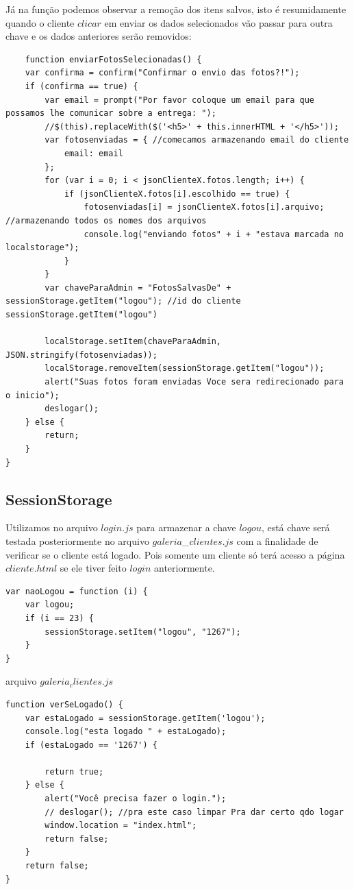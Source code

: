 	Já na função podemos observar a remoção dos itens salvos, isto é resumidamente quando o cliente $clicar$ em enviar os dados selecionados vão passar para outra chave e os dados anteriores serão removidos:
	\begin{lstlisting}	
	function enviarFotosSelecionadas() {
    var confirma = confirm("Confirmar o envio das fotos?!");
    if (confirma == true) {
        var email = prompt("Por favor coloque um email para que possamos lhe comunicar sobre a entrega: ");
        //$(this).replaceWith($('<h5>' + this.innerHTML + '</h5>'));
        var fotosenviadas = { //comecamos armazenando email do cliente
            email: email
        };
        for (var i = 0; i < jsonClienteX.fotos.length; i++) {
            if (jsonClienteX.fotos[i].escolhido == true) {
                fotosenviadas[i] = jsonClienteX.fotos[i].arquivo; //armazenando todos os nomes dos arquivos
                console.log("enviando fotos" + i + "estava marcada no localstorage");
            }
        }
        var chaveParaAdmin = "FotosSalvasDe" + sessionStorage.getItem("logou"); //id do cliente sessionStorage.getItem("logou")
        
        localStorage.setItem(chaveParaAdmin, JSON.stringify(fotosenviadas));
        localStorage.removeItem(sessionStorage.getItem("logou"));
        alert("Suas fotos foram enviadas Voce sera redirecionado para o inicio");
        deslogar();
    } else {
        return;
    }
}	
		\end{lstlisting}
\subsection{SessionStorage}

	Utilizamos no arquivo $login.js$ para armazenar a chave $logou$, está chave será testada posteriormente no arquivo $galeria$\_$clientes.js$ com a finalidade de verificar se o cliente está logado. Pois somente um cliente só terá acesso a página $cliente.html$ se ele tiver feito $login$ anteriormente. 
	
\begin{lstlisting}
var naoLogou = function (i) {
    var logou;
    if (i == 23) {
        sessionStorage.setItem("logou", "1267");
    }
}
\end{lstlisting}

arquivo $galeria_clientes.js$

\begin{lstlisting}
function verSeLogado() {
    var estaLogado = sessionStorage.getItem('logou');
    console.log("esta logado " + estaLogado);
    if (estaLogado == '1267') {

        return true;
    } else {
        alert("Você precisa fazer o login.");
        // deslogar(); //pra este caso limpar Pra dar certo qdo logar 
        window.location = "index.html";
        return false;
    }
    return false;
}
\end{lstlisting}

